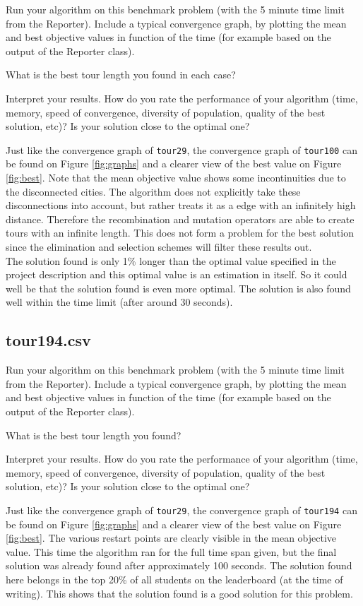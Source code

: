 \documentclass[a4paper,10pt]{article}
\newcommand{\ReplaceMe}[1]{{\color{blue}#1}}
\begin{document}
\ReplaceMe{Run your algorithm on this benchmark problem (with the 5 minute time limit from the Reporter). Include a typical convergence graph, by plotting the mean and best objective values in function of the time (for example based on the output of the Reporter class). 

What is the best tour length you found in each case? 

Interpret your results. How do you rate the performance of your algorithm (time, memory, speed of convergence, diversity of population, quality of the best solution, etc)? Is your solution close to the optimal one?}

Just like the convergence graph of \texttt{tour29}, the convergence graph of \texttt{tour100} can be found on Figure \ref{fig:graphs} and a clearer view of the best value on Figure \ref{fig:best}. Note that the mean objective value shows some incontinuities due to the disconnected cities. The algorithm does not explicitly take these disconnections into account, but rather treats it as a edge with an infinitely high distance. Therefore the recombination and mutation operators are able to create tours with an infinite length. This does not form a problem for the best solution since the elimination and selection schemes will filter these results out.\\
The solution found is only 1\% longer than the optimal value specified in the project description and this optimal value is an estimation in itself. So it could well be that the solution found is even more optimal. The solution is also found well within the time limit (after around 30 seconds). 

\subsection{tour194.csv}

\ReplaceMe{Run your algorithm on this benchmark problem (with the 5 minute time limit from the Reporter). Include a typical convergence graph, by plotting the mean and best objective values in function of the time (for example based on the output of the Reporter class). 

What is the best tour length you found? 

Interpret your results. How do you rate the performance of your algorithm (time, memory, speed of convergence, diversity of population, quality of the best solution, etc)? Is your solution close to the optimal one?}

Just like the convergence graph of \texttt{tour29}, the convergence graph of \texttt{tour194} can be found on Figure \ref{fig:graphs} and a clearer view of the best value on Figure \ref{fig:best}. The various restart points are clearly visible in the mean objective value. This time the algorithm ran for the full time span given, but the final solution was already found after approximately 100 seconds. The solution found here belongs in the top 20\% of all students on the leaderboard (at the time of writing). This shows that the solution found is a good solution for this problem.
\end{document}
